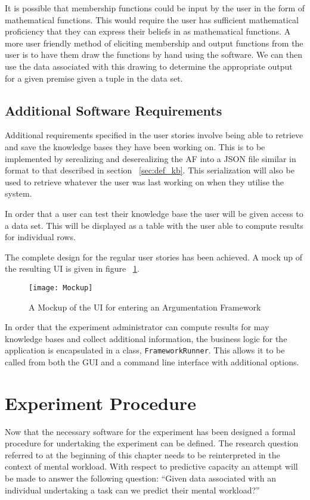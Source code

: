 It is possible that membership functions could be input by the user in the form of mathematical functions. This would require the user has sufficient mathematical proficiency that they can express their beliefs in as mathematical functions. A more user friendly method of eliciting membership and output functions from the user is to have them draw the functions by hand using the software. We can then use the data associated with this drawing to determine the appropriate output for a given premise given a tuple in the data set.

\subsection{Additional Software Requirements}

Additional requirements specified in the user stories involve being able to retrieve and save the knowledge bases they have been working on. This is to be implemented by serealizing and deserealizing the AF into a JSON file similar in format to that described in section ~\ref{sec:def_kb}. This serialization will also be used to retrieve whatever the user was last working on when they utilise the system.

In order that a user can test their knowledge base the user will be given access to a data set. This will be displayed as a table with the user able to compute results for individual rows.

The complete design for the regular user stories has been achieved. A mock up of the resulting UI is given in figure ~\ref{fig:fullMU}.

\begin{figure}[h]
    \centering
    \texttt{[image: Mockup]}
    \caption{A Mockup of the UI for entering an Argumentation Framework}
    \label{fig:fullMU}
\end{figure}

In order that the experiment administrator can compute results for may knowledge bases and collect additional information, the business logic for the application is encapsulated in a class, \lstinline{FrameworkRunner}. This allows it to be called from both the GUI and a command line interface with additional options.

\section{Experiment Procedure}

Now that the necessary software for the experiment has been designed a formal procedure for undertaking the experiment can be defined. The research question referred to at the beginning of this chapter needs to be reinterpreted in the context of mental workload. With respect to predictive capacity an attempt will be made to answer the following question: ``Given data associated with an individual undertaking a task can we predict their mental workload?'' 

